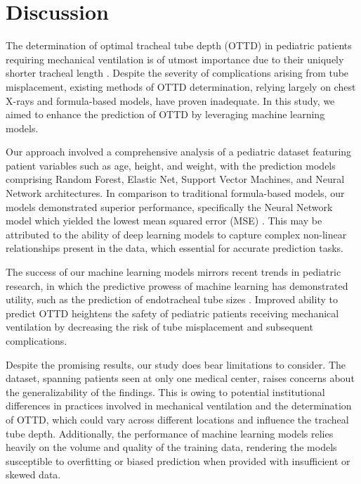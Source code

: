 \documentclass[11pt]{article}
\begin{document}
\section*{Discussion}

The determination of optimal tracheal tube depth (OTTD) in pediatric patients requiring mechanical ventilation is of utmost importance due to their uniquely shorter tracheal length \cite{Kollef1994EndotrachealTM, Licker2007PerioperativeMM}. Despite the severity of complications arising from tube misplacement, existing methods of OTTD determination, relying largely on chest X-rays and formula-based models, have proven inadequate. In this study, we aimed to enhance the prediction of OTTD by leveraging machine learning models.

Our approach involved a comprehensive analysis of a pediatric dataset featuring patient variables such as age, height, and weight, with the prediction models comprising Random Forest, Elastic Net, Support Vector Machines, and Neural Network architectures. In comparison to traditional formula-based models, our models demonstrated superior performance, specifically the Neural Network model which yielded the lowest mean squared error (MSE) \cite{Cheng2016RiskPW}. This may be attributed to the ability of deep learning models to capture complex non-linear relationships present in the data, which essential for accurate prediction tasks. 

The success of our machine learning models mirrors recent trends in pediatric research, in which the predictive prowess of machine learning has demonstrated utility, such as the prediction of endotracheal tube sizes \cite{Zhou2022PredictionOE}. Improved ability to predict OTTD heightens the safety of pediatric patients receiving mechanical ventilation by decreasing the risk of tube misplacement and subsequent complications.

Despite the promising results, our study does bear limitations to consider. The dataset, spanning patients seen at only one medical center, raises concerns about the generalizability of the findings. This is owing to potential institutional differences in practices involved in mechanical ventilation and the determination of OTTD, which could vary across different locations and influence the tracheal tube depth. Additionally, the performance of machine learning models relies heavily on the volume and quality of the training data, rendering the models susceptible to overfitting or biased prediction when provided with insufficient or skewed data. 
\end{document}
